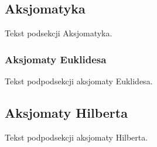 %

\subsection{Aksjomatyka}
Tekst podsekcji Aksjomatyka.

\subsubsection{Aksjomaty Euklidesa}
Tekst podpodsekcji aksjomaty Euklidesa.

\subsection{Aksjomaty Hilberta}
Tekst podpodsekcji aksjomaty Hilberta.

%